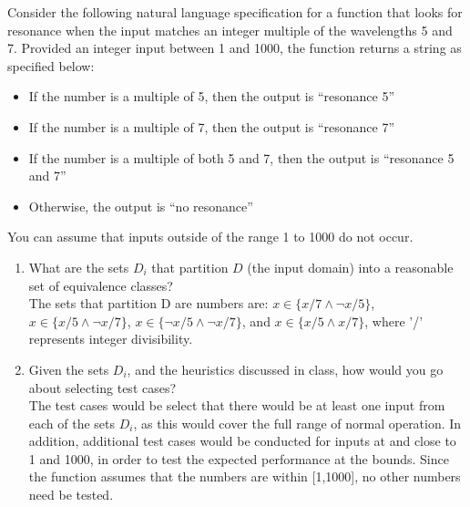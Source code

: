 \documentclass[12pt,fleqn]{examtst}
\begin{document}

\newpage

 Consider the following natural language specification for a
function that looks for resonance when the input matches an integer multiple of
the wavelengths 5 and 7. Provided an integer input between 1 and 1000, the
function returns a string as specified below:

\begin{itemize}
\item If the number is a multiple of 5, then the output is “resonance 5”
\item If the number is a multiple of 7, then the output is “resonance 7”
\item If the number is a multiple of both 5 and 7, then the output is “resonance
  5 and 7”
\item Otherwise, the output is “no resonance”
\end{itemize}

You can assume that inputs outside of the range 1 to 1000 do not occur.

\begin{enumerate}
\item What are the sets $D_i$ that partition $D$ (the input domain) into a
  reasonable set of equivalence classes? \\
The sets that partition D are numbers are: $x \in \{x / 7 \land \lnot x / 5\}$, $x \in \{x / 5 \land \lnot x / 7\}$, $x \in \{\lnot x / 5 \land \lnot x / 7\}$, and $x \in \{x / 5 \land x / 7\}$, where '/' represents integer divisibility.


\item Given the sets $D_i$, and the heuristics discussed in class, how would you
  go about selecting test cases? \\

The test cases would be select that there would be at least one input from each of the sets $D_i$, as this would cover the full range of normal operation. In addition, additional test cases would be conducted for inputs at and close to 1 and 1000, in order to test the expected performance at the bounds. Since the function assumes that the numbers are within [1,1000], no other numbers need be tested. 
  
\end{enumerate}
  

\newpage
\end{document}
